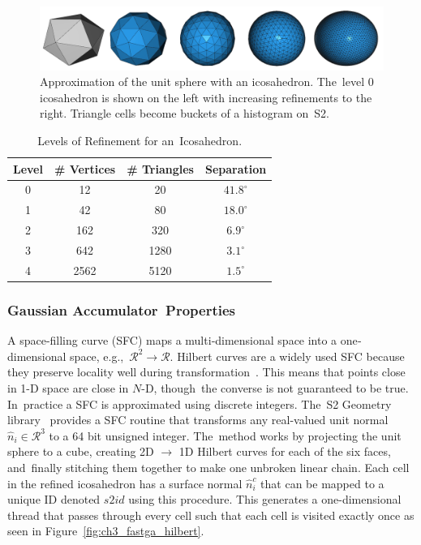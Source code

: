 \begin{figure}[H]
    \centering
    \includegraphics[width=.60\linewidth]{chapter_3_polylidar3d/imgs/fastga_ico_refinement_v2.png}
    \caption[Approximation of the unit sphere with an icosahedron]{Approximation of the unit sphere with an icosahedron. The~level 0 icosahedron is shown on the  left with increasing refinements to the right.  Triangle cells become buckets of a histogram on~S2. }
    \label{fig:ch3_fastga_refinement}
\end{figure}
\unskip

\begin{table}[H]
\centering
\caption{Levels of Refinement for an~Icosahedron.}\label{table:ch3_fastga_refinement}
\begin{tabular}{@{}cccc@{}}
\toprule
\textbf{Level} & \textbf{\# Vertices} & \textbf{\# Triangles }& \textbf{Separation} \\ \midrule
0     & 12          & 20           & $41.8^{\circ}$          \\
1     & 42          & 80           & $18.0^{\circ}$            \\
2     & 162         & 320          & $6.9^{\circ}$              \\
3     & 642         & 1280         & $3.1^{\circ}$              \\
4     & 2562        & 5120         & $1.5^{\circ}$              \\ \bottomrule
\end{tabular}
\end{table}
\unskip



\subsubsection{Gaussian Accumulator~Properties}\label{sec:ch3_methods_fastga_ga}

A space-filling curve (SFC) maps a multi‐dimensional space into a one‐dimensional space, e.g.,~$\mathcal{R}^2 \rightarrow \mathcal{R}$.  Hilbert curves are a widely used SFC because they preserve locality well during transformation~\cite{mokbel_space-filling_2008}. This means that points close in 1-D space are close in $N$-D, though~the converse is not guaranteed to be true. In~practice a SFC is approximated using discrete integers. The~S2 Geometry library~\cite{google_s2_2020} provides a SFC routine that transforms any real-valued unit normal $\hat{n}_i \in \mathcal{R}^3$ to a 64 bit unsigned integer. The~method works by projecting the unit sphere to a cube, creating 2D $\rightarrow$ 1D Hilbert curves for each of the six faces, and~finally stitching them together to make one unbroken linear chain.  Each cell in the refined icosahedron has a surface normal $\hat{n}^{c}_{i}$ that can be mapped to a unique ID denoted $s2id$ using this procedure. This generates a one-dimensional thread that passes through every cell such that each cell is visited exactly once as seen in Figure~\ref{fig:ch3_fastga_hilbert}.

